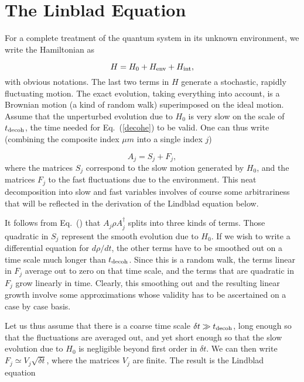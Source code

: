 \documentclass[12pt]{article}
\def\beq{\begin{equation}}
\def\eeq{\end{equation}}
\def\Eq{Eq.~(\ref}
\begin{document}
\section{The Linblad Equation}

For a complete treatment of the quantum system in its unknown
environment, we write the Hamiltonian as

\beq H=H_0+H_{{\rm env}}+H_{{\rm int}}, \eeq
with obvious notations. The last two terms in $H$ generate a stochastic,
rapidly fluctuating motion. The exact evolution, taking everything into
account, is a Brownian motion (a kind of random walk) superimposed on
the ideal motion. Assume that the unperturbed evolution due to $H_0$ is
very slow on the scale of $t_{{\rm decoh}}$, the time needed for
\Eq{decohe}) to be valid. One can thus write (combining the composite
index $\mu m$ into a single index $j$)

\beq A_j = S_j + F_j, \eeq
where the matrices $S_j$ correspond to the slow motion generated by
$H_0$, and the matrices $F_j$ to the fast fluctuations due to the
environment. This neat decomposition into slow and fast variables
involves of course some arbitrariness that will be reflected in the
derivation of the Lindblad equation below.

It follows from Eq.~(\theequation) that $A_j\rho A_j^\dagger$ splits
into three kinds of terms. Those quadratic in $S_j$ represent the smooth
evolution due to $H_0$. If we wish to write a differential equation for
$d\rho/dt$, the other terms have to be smoothed out on a time scale much
longer than $t_{{\rm decoh}}$. Since this is a random walk, the terms
linear in $F_j$ average out to zero on that time scale, and the terms
that are quadratic in $F_j$ grow linearly in time. Clearly, this
smoothing out and the resulting linear growth involve some
approximations whose validity has to be ascertained on a case by case
basis.

Let us thus assume that there is a coarse time scale $\delta t\gg
t_{{\rm decoh}}$, long enough so that the fluctuations are averaged out,
and yet short enough so that the slow evolution due to $H_0$ is
negligible beyond first order in $\delta t$. We can then write
$F_j\simeq V_j\sqrt{\delta t}$, where the matrices $V_j$ are finite. The
result is the Lindblad equation~\cite{lindblad}
\end{document}
